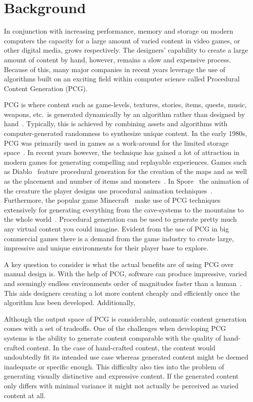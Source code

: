 \section{Background}
In conjunction with increasing performance, memory and storage on modern computers the capacity for a large amount of varied content in video games, or other digital media, grows respectively.
The designers' capability to create a large amount of content by hand, however, remains a slow and expensive process.
Because of this, many major companies in recent years leverage the use of algorithms built on an exciting field within computer science called Procedural Content Generation (PCG).

PCG is where content such as game-levels, textures, stories, items, quests, music, weapons, etc.\ is generated dynamically by an algorithm rather than designed by hand~\cite[p.1]{PCG_in_games}.
Typically, this is achieved by combining assets and algorithms with computer-generated randomness to synthesize unique content.
In the early 1980s, PCG was primarily used in games as a work-around for the limited storage space~\cite[p.4]{PCG_in_games}.
In recent years however, the technique has gained a lot of attraction in modern games for generating compelling and replayable experiences.
Games such as Diablo~\cite{diablo} feature procedural generation for the creation of the maps and as well as the placement and number of items and monsters~\cite[p.4]{PCG_in_games}.
In Spore~\cite{spore} the animation of the creature the player designs use procedural animation techniques~\cite[p.4]{PCG_in_games}.
Furthermore, the popular game Minecraft~\cite{minecraft} make use of PCG techniques extensively for generating everything from the cave-systems to the mountains to the whole world~\cite[p.4]{PCG_in_games}.
Procedural generation can be used to generate pretty much any virtual content you could imagine.
Evident from the use of PCG in big commercial games there is a demand from the game industry to create large, impressive and unique environments for their player base to explore.

A key question to consider is what the actual benefits are of using PCG over manual design is.
With the help of PCG, software can produce impressive, varied and seemingly endless environments order of magnitudes faster than a human~\cite[p.3]{PCG_in_games}.
This aids designers creating a lot more content cheaply and efficiently once the algorithm has been developed.
Additionally, 

Although the output space of PCG is considerable, automatic content generation comes with a set of tradeoffs.
One of the challenges when developing PCG systems is the ability to generate content comparable with the quality of hand-crafted content.
In the case of hand-crafted content, the content would undoubtedly fit its intended use case whereas generated content might be deemed inadequate or specific enough.
This difficulty also ties into the problem of generating visually distinctive and expressive content.
If the generated content only differs with minimal variance it might not actually be perceived as varied content at all.
